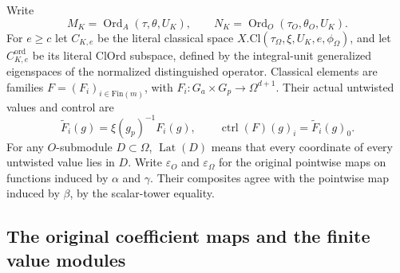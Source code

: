 \documentclass[11pt,a4paper]{article}
\numberwithin{equation}{section}
\theoremstyle{remark}\newtheorem{remark}[theorem]{Remark}
\begin{document}
Write
\[
 M_K=\operatorname{Ord}_A(\tau,\theta,\allowbreak{} U_K),\qquad
 N_K=\operatorname{Ord}_O(\tau_O,\theta_O,\allowbreak{} U_K).
\]
For $e\geq c$ let $C_{K,\allowbreak{} e}$ be the literal classical space
$X.\mathrm{Cl}(\tau_\Omega,\xi,\allowbreak{} U_K,\allowbreak{} e,\phi_\Omega)$,
and let $C^{\mathrm{ord}}_{K,\allowbreak{} e}$ be its literal
$\mathrm{ClOrd}$ subspace, defined by the integral-unit
generalized eigenspaces of the normalized distinguished
operator.  Classical elements are families
$F=(F_i)_{i\in\mathrm{Fin}(m)}$, with
$F_i:G_a\times G_p\to\Omega^{d+1}$.
Their actual untwisted values and control are
\begin{equation}\label{eq:smp-untwisted}
 \widetilde F_i(g)=\xi(g_p)^{-1}F_i(g),\qquad
 \operatorname{ctrl}(F)(g)_i=\widetilde F_i(g)_0.
\end{equation}
For any $O$-submodule $D\subset\Omega$,
$\operatorname{Lat}(D)$ means that every coordinate of
every untwisted value lies in $D$.
Write $\varepsilon_O$ and $\varepsilon_\Omega$ for the
original pointwise maps on functions induced by $\alpha$
and $\gamma$.  Their composites agree with the pointwise
map induced by $\beta$, by the scalar-tower equality.

\subsection{The original coefficient maps and the finite value modules}

\end{document}
